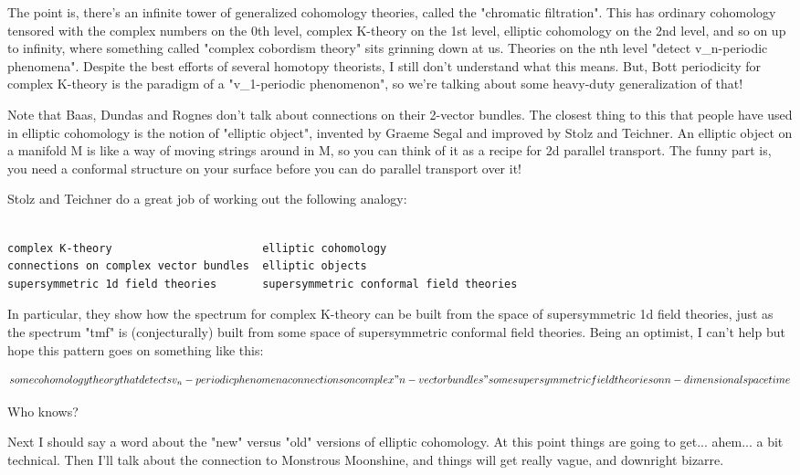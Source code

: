 The point is, there's an infinite tower of generalized cohomology
theories, called the "chromatic filtration".  This has ordinary 
cohomology tensored with the complex numbers on the 0th level, 
complex K-theory on the 1st level, elliptic cohomology on the 2nd 
level, and so on up to infinity, where something called "complex 
cobordism theory" sits grinning down at us.  Theories on the nth 
level "detect v_{n}-periodic phenomena".  
Despite the best efforts
of several homotopy theorists, I still don't understand what this
means.  But, Bott periodicity for complex K-theory is the paradigm 
of a "v_{1}-periodic 
phenomenon", so we're talking about some heavy-duty 
generalization of that!  

Note that Baas, Dundas and Rognes don't talk about connections 
on their 2-vector bundles.  The closest thing to this that
people have used in elliptic cohomology is the notion of
"elliptic object", invented by Graeme Segal and improved by
Stolz and Teichner.  An elliptic object on a manifold M is 
like a way of moving strings around in M, so you can think of 
it as a recipe for 2d parallel transport.  The funny part is, 
you need a conformal structure on your surface before you can 
do parallel transport over it!  

Stolz and Teichner do a great job of working out the following analogy:


\begin{verbatim}

complex K-theory                       elliptic cohomology
connections on complex vector bundles  elliptic objects
supersymmetric 1d field theories       supersymmetric conformal field theories
\end{verbatim}
    
In particular, they show how the spectrum for complex K-theory
can be built from the space of supersymmetric 1d field theories,
just as the spectrum "tmf" is (conjecturally) built from some
space of supersymmetric conformal field theories.  Being an
optimist, I can't help but hope this pattern goes on something like this:


$$

some cohomology theory that detects v_{n}-periodic phenomena
connections on complex "n-vector bundles"
some supersymmetric field theories on n-dimensional spacetime
$$
    
Who knows?  

Next I should say a word about the "new" versus "old"
versions of elliptic cohomology.  At this
point things are going to get... ahem... a bit technical.
Then I'll talk about the connection to Monstrous Moonshine, and things will
get really vague, and downright bizarre.

